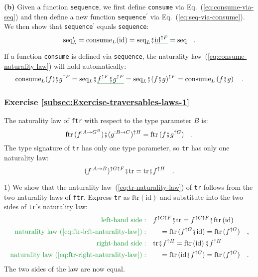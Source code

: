\textbf{(b)} Given a function \lstinline!sequence!, we first define
\lstinline!consume! via Eq.~(\ref{eq:consume-via-seq}) and then
define a new function \lstinline!sequence!$^{\prime}$ via Eq.~(\ref{eq:seq-via-consume}).
We then show that \lstinline!sequence!$^{\prime}$ equals \lstinline!sequence!:
\[
\text{seq}_{L}^{\prime}=\text{consume}_{L}(\text{id})=\text{seq}_{L}\bef\gunderline{\text{id}^{\uparrow F}}=\text{seq}\quad.
\]

If a function \lstinline!consume! is defined via \lstinline!sequence!,
the naturality law~(\ref{eq:consume-naturality-law}) will hold automatically:
\[
\text{consume}_{L}(f)\bef g^{\uparrow F}=\text{seq}_{L}\bef\gunderline{f^{\uparrow F}\bef g^{\uparrow F}}=\text{seq}_{L}\bef(f\bef g)^{\uparrow F}=\text{consume}_{L}\left(f\bef g\right)\quad.
\]


\subsubsection*{Exercise \ref{subsec:Exercise-traversables-laws-1}}

The naturality law of \lstinline!ftr! with respect to the type parameter
$B$ is:
\begin{equation}
\text{ftr}\,(f^{:A\rightarrow G^{B}})\bef(g^{:B\rightarrow C})^{\uparrow H}=\text{ftr}\,(f\bef g^{\uparrow G})\quad.\label{eq:ftr-right-naturality-law}
\end{equation}
The type signature of \lstinline!tr! has only one type parameter,
so \lstinline!tr! has only one naturality law:
\begin{equation}
(f^{:A\rightarrow B})^{\uparrow G\uparrow F}\bef\text{tr}=\text{tr}\bef f^{\uparrow H}\quad.\label{eq:tr-naturality-law}
\end{equation}

1) We show that the naturality law~(\ref{eq:tr-naturality-law})
of \lstinline!tr! follows from the two naturality laws of \lstinline!ftr!.
Express \lstinline!tr! as $\text{ftr}\left(\text{id}\right)$ and
substitute into the two sides of \lstinline!tr!\textsf{'}s naturality law:
\begin{align*}
{\color{greenunder}\text{left-hand side}:}\quad & f^{\uparrow G\uparrow F}\bef\text{tr}=f^{\uparrow G\uparrow F}\bef\text{ftr}\left(\text{id}\right)\\
{\color{greenunder}\text{naturality law~(\ref{eq:ftr-left-naturality-law})}:}\quad & \quad=\text{ftr}\,(f^{\uparrow G}\bef\text{id})=\text{ftr}\,(f^{\uparrow G})\quad,\\
{\color{greenunder}\text{right-hand side}:}\quad & \text{tr}\bef f^{\uparrow H}=\text{ftr}\left(\text{id}\right)\bef f^{\uparrow H}\\
{\color{greenunder}\text{naturality law~(\ref{eq:ftr-right-naturality-law})}:}\quad & \quad=\text{ftr}\,(\text{id}\bef f^{\uparrow G})=\text{ftr}\,(f^{\uparrow G})\quad.
\end{align*}
The two sides of the law are now equal.

